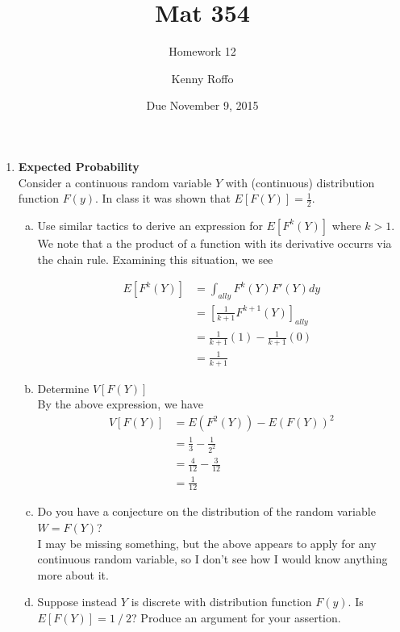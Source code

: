 \documentclass{scrartcl}
\title{Mat 354}
\subtitle{Homework 12}
\author{Kenny Roffo}
\date{Due November 9, 2015}
\begin{document}
\maketitle

\begin{enumerate}

\item \textbf{Expected Probability}\\
  Consider a continuous random variable $Y$ with (continuous) distribution function $F(y)$. In class it was shown that $E[F(Y)] = \frac{1}{2}$.

  \begin{enumerate}[a)]
  \item Use similar tactics to derive an expression for $E[F^k(Y)]$ where $k>1$.\\

    We note that a the product of a function with its derivative occurrs via the chain rule. Examining this situation, we see

    \begin{align*}
      E[F^k(Y)] &= \int_{all y}F^k(Y)F'(Y)dy\\
      &= \left[\frac{1}{k+1}F^{k+1}(Y)\right]_{all y}\\
      &= \frac{1}{k+1}(1) - \frac{1}{k+1}(0)\\
      &= \frac{1}{k+1}
    \end{align*}

  \item Determine $V[F(Y)]$\\

    By the above expression, we have
    \begin{align*}
      V[F(Y)] &= E(F^2(Y)) - E(F(Y))^2\\
      &= \frac{1}{3} - \frac{1}{2^2}\\
      &=\frac{4}{12} - \frac{3}{12}\\
      &= \frac{1}{12}
    \end{align*}

  \item Do you have a conjecture on the distribution of the random variable $W = F(Y)$?\\

    I may be missing something, but the above appears to apply for any continuous random variable, so I don't see how I would know anything more about it.\\

  \item Suppose instead $Y$ is discrete with distribution function $F(y)$. Is $E[F(Y)] = 1⁄2$? Produce an argument for your assertion.\\


\end{enumerate}
\end{enumerate}
\end{document}
